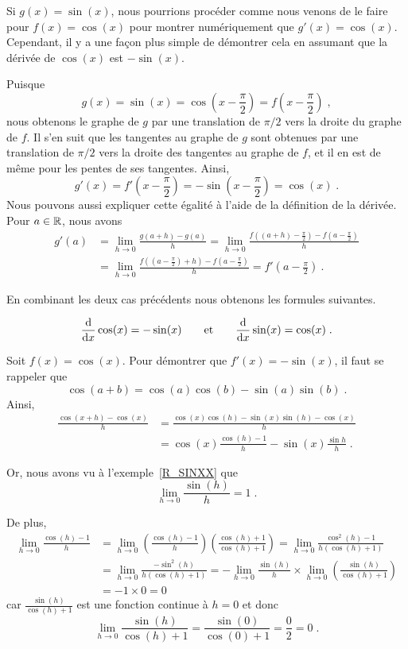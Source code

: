 {Si $g(x) = \sin(x)$, nous pourrions procéder comme nous venons de le faire
pour $f(x)=\cos(x)$ pour montrer numériquement que
$g'(x) = \cos(x)$.  Cependant, il y a une façon plus simple de
démontrer cela en assumant que la dérivée de $\cos(x)$ est
$-\sin(x)$.

Puisque
\[
g(x) = \sin(x) = \cos\left(x-\frac{\pi}{2}\right) =
f\left(x-\frac{\pi}{2}\right) \; ,
\]
nous obtenons le graphe de $g$ par une translation de $\pi/2$
vers la droite du graphe de $f$.  Il s'en suit que les tangentes au
graphe de $g$ sont obtenues par une translation de $\pi/2$
vers la droite des tangentes au graphe de $f$, et il en est de même
pour les pentes de ses tangentes.  Ainsi,
\[
g'(x) = f'\left(x - \frac{\pi}{2}\right) =
-\sin\left(x - \frac{\pi}{2}\right) = \cos(x) \; .
\]
Nous pouvons aussi expliquer cette égalité à l'aide de la définition de la
dérivée.  Pour $a\in \RR$, nous avons
\begin{align*}
g'(a) &= \lim_{h\rightarrow 0} \frac{g(a+h)-g(a)}{h}
= \lim_{h\rightarrow 0} \frac{f\left((a+h)-\frac{\pi}{2}\right) -
f\left(a-\frac{\pi}{2}\right)}{h} \\
&= \lim_{h\rightarrow 0} \frac{f\left(\left(a-\frac{\pi}{2}\right) + h \right)
- f\left(a-\frac{\pi}{2}\right)}{h}
= f'\left(a-\frac{\pi}{2}\right) \ .
\end{align*}

En combinant les deux cas précédents nous obtenons les formules suivantes.

\begin{focus}{\prp}
\[
\dfdx{\cos(x)}{x} = -\sin(x) \qquad \text{et} \qquad
\dfdx{\sin(x)}{x} = \cos(x) \; .
\]
\end{focus}

Soit $f(x) = \cos(x)$.  Pour démontrer que $f'(x) = -\sin(x)$, il faut
se rappeler que
\[
\cos(a+b) = \cos(a)\cos(b) - \sin(a)\sin(b) \; .
\]
Ainsi,
\begin{align*}
\frac{\cos(x+h)-\cos(x)}{h}
&= \frac{\cos(x)\cos(h) - \sin(x)\sin(h) - \cos(x)}{h} \\
&= \cos(x) \frac{\cos(h)-1}{h} - \sin(x) \frac{\sin{h}}{h} \; .
\end{align*}

Or, nous avons vu à l'exemple~\ref{R_SINXX} que
\[
\lim_{h\rightarrow 0} \frac{\sin(h)}{h} =1 \; .
\]

De plus,
\begin{align*}
\lim_{h\rightarrow 0} \frac{\cos(h)-1}{h}
&= \lim_{h\rightarrow 0} \left(\frac{\cos(h)-1}{h}\right)
\left(\frac{\cos(h)+1}{\cos(h)+1}\right)
= \lim_{h\rightarrow 0}\frac{\cos^2(h)-1}{h(\cos(h)+1)} \\
&= \lim_{h\rightarrow 0} \frac{-\sin^2(h)}{h(\cos(h)+1)}
= -\lim_{h\rightarrow 0} \frac{\sin(h)}{h}
\times \lim_{h\rightarrow 0} \left(\frac{\sin(h)}{\cos(h)+1}\right) \\
&= - 1 \times 0 = 0
\end{align*}
car $\displaystyle \frac{\sin(h)}{\cos(h)+1}$ est une fonction
continue à $h=0$ et donc
\[
\lim_{h\rightarrow 0} \frac{\sin(h)}{\cos(h)+1}=
\frac{\sin(0)}{\cos(0)+1} = \frac{0}{2} = 0 \; .
\]

}
